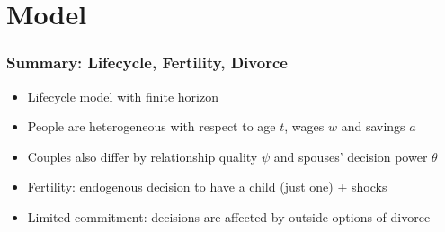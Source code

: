 \documentclass[aspectratio=169]{beamer}
\let\olditem\item
\renewcommand{\item}{%
\olditem\vspace{\fill}}
\begin{document}
\section{Model}
\begin{frame}
\frametitle{Summary: Lifecycle, Fertility, Divorce}
\begin{itemize}
\item Lifecycle model with finite horizon
\item People are heterogeneous with respect to age $t$, wages $w$ and savings $a$
\item Couples also differ by relationship quality $\psi$ and spouses' decision power $\theta$
\item Fertility: endogenous decision to have a child (just one) + shocks
\item Limited commitment: decisions are affected by outside options of divorce
\end{itemize}
\end{frame}
\end{document}
